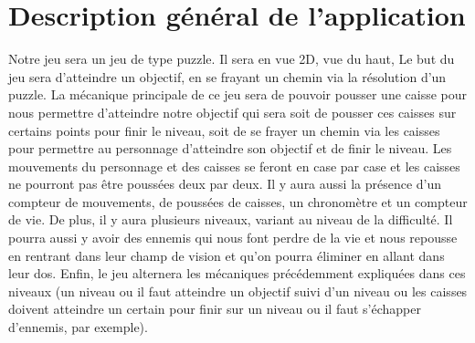 \section{Description général de l'application}
Notre jeu sera un jeu de type puzzle. Il sera en vue 2D, vue du haut, Le but du jeu sera d’atteindre un objectif, en se frayant un chemin via la résolution d’un puzzle. La mécanique principale de ce jeu sera de pouvoir pousser une caisse pour 
nous permettre d’atteindre notre objectif qui sera soit de pousser ces caisses sur certains points pour finir le niveau, soit de se frayer un chemin via les caisses pour permettre au personnage d’atteindre son objectif et de finir le niveau. Les 
mouvements du personnage et des caisses se feront en case par case et les caisses ne pourront pas être poussées deux par deux. Il y aura aussi la présence d’un compteur de mouvements, de poussées de caisses, un chronomètre et un compteur de vie. 
De plus, il y aura plusieurs niveaux, variant au niveau de la difficulté. Il pourra aussi y avoir des ennemis qui nous font perdre de la vie et nous repousse en rentrant dans leur champ de vision et qu’on pourra éliminer en allant dans leur dos. 
Enfin, le jeu alternera les mécaniques précédemment expliquées dans ces niveaux (un niveau ou il faut atteindre un objectif suivi d’un niveau ou les caisses doivent atteindre un certain pour finir sur un niveau ou il faut s’échapper d’ennemis, 
par exemple).